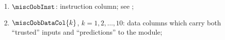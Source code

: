 \begin{enumerate}[resume]
	\item $\miscOobInst$:
		\oobMod{} instruction column; see ;
	\item $\miscOobDataCol{k}$, $k=1, 2, \dots, 10$:
		data columns which carry both ``trusted'' inputs and ``predictions'' to the \oobMod{} module;
\end{enumerate}
